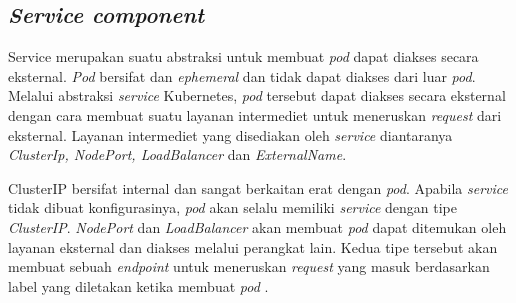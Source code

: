 \subsection{\textit{Service component}}

Service merupakan suatu abstraksi untuk membuat \textit{pod} dapat diakses secara eksternal. \textit{Pod} bersifat dan \textit{ephemeral} dan tidak dapat diakses dari luar \textit{pod}. Melalui abstraksi \textit{service} Kubernetes, \textit{pod} tersebut dapat diakses secara eksternal dengan cara membuat suatu layanan intermediet untuk meneruskan \textit{request} dari eksternal.
Layanan intermediet yang disediakan oleh \textit{service} diantaranya \textit{ClusterIp, NodePort, LoadBalancer} dan  \textit{ExternalName}.

ClusterIP bersifat internal dan sangat berkaitan erat dengan \textit{pod}. Apabila \textit{service} tidak dibuat konfigurasinya, \textit{pod} akan selalu memiliki \textit{service} dengan tipe \textit{ClusterIP}. \textit{NodePort} dan \textit{LoadBalancer} akan membuat \textit{pod} dapat ditemukan oleh layanan eksternal dan diakses melalui perangkat lain. Kedua tipe tersebut akan membuat sebuah \textit{endpoint} untuk meneruskan \textit{request} yang masuk berdasarkan label yang diletakan ketika membuat \textit{pod} \parencite{service}.